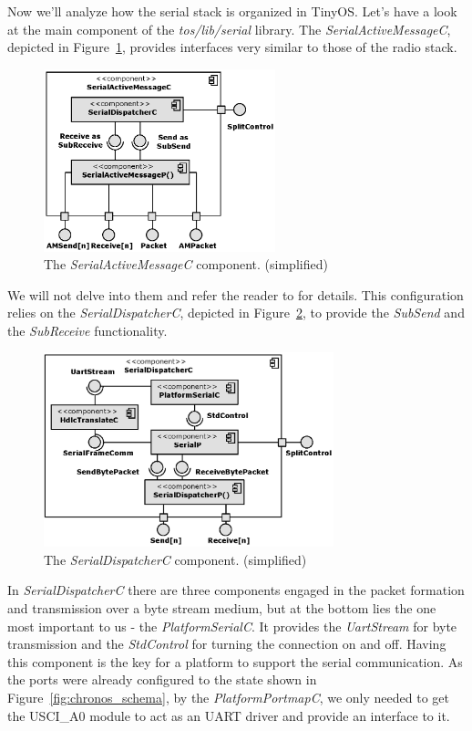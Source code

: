 Now we'll analyze how the serial stack is organized in TinyOS. Let's have a look at the main component of the \emph{tos/lib/serial} library. The \emph{SerialActiveMessageC}, depicted in Figure~\ref{fig:serial_active_message_c}, provides interfaces very similar to those of the radio stack.
\begin{figure}[h]
  \centering
  \includegraphics[width=0.6\textwidth]{diagrams/serial_active_message_c.eps}
  \caption{The \emph{SerialActiveMessageC} component. (simplified)}
  \label{fig:serial_active_message_c}
\end{figure}
We will not delve into them and refer the reader to \cite{TEP113} for details. This configuration relies on the \emph{SerialDispatcherC}, depicted in Figure~\ref{fig:serial_dispatcher_c}, to provide the \emph{SubSend} and the \emph{SubReceive} functionality.
\begin{figure}[h]
  \centering
  \includegraphics[width=0.75\textwidth]{diagrams/serial_dispatcher_c.eps}
  \caption{The \emph{SerialDispatcherC} component. (simplified)}
  \label{fig:serial_dispatcher_c}
\end{figure}
In \emph{SerialDispatcherC} there are three components engaged in the packet formation and transmission over a byte stream medium, but at the bottom lies the one most important to us - the \emph{PlatformSerialC}. It provides the \emph{UartStream} for byte transmission and the \emph{StdControl} for turning the connection on and off. Having this component is the key for a platform to support the serial communication. As the ports were already configured to the state shown in Figure~\ref{fig:chronos_schema}, by the \emph{PlatformPortmapC}, we only needed to get the USCI\_A0 module to act as an UART driver and provide an interface to it.

